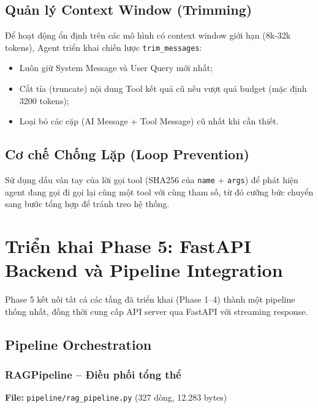 \documentclass[../DoAn.tex]{subfiles}
\begin{document}
\subsection{Quản lý Context Window (Trimming)}
Để hoạt động ổn định trên các mô hình có context window giới hạn (8k-32k tokens), Agent triển khai chiến lược \texttt{trim_messages}:
\begin{itemize}
    \item Luôn giữ System Message và User Query mới nhất;
    \item Cắt tỉa (truncate) nội dung Tool kết quả cũ nếu vượt quá budget (mặc định 3200 tokens);
    \item Loại bỏ các cặp (AI Message + Tool Message) cũ nhất khi cần thiết.
\end{itemize}

\subsection{Cơ chế Chống Lặp (Loop Prevention)}
Sử dụng dấu vân tay của lời gọi tool (SHA256 của \texttt{name} + \texttt{args}) để phát hiện agent đang gọi đi gọi lại cùng một tool với cùng tham số, từ đó cưỡng bức chuyển sang bước tổng hợp để tránh treo hệ thống.


\section{Triển khai Phase 5: FastAPI Backend và Pipeline Integration}

Phase 5 kết nối tất cả các tầng đã triển khai (Phase 1--4) thành một pipeline thống nhất, đồng thời cung cấp API server qua FastAPI với streaming response.

\subsection{Pipeline Orchestration}

\subsubsection{RAGPipeline -- Điều phối tổng thể}
\textbf{File:} \texttt{pipeline/rag\_pipeline.py} (327 dòng, 12.283 bytes)
\end{document}
